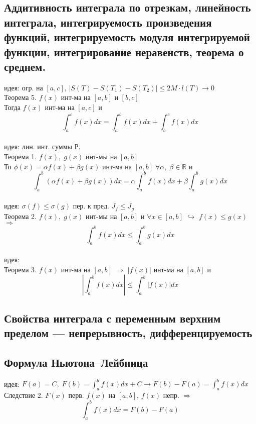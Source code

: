 \documentclass{article}
\begin{document}
\subsection{Аддитивность интеграла по отрезкам, линейность интеграла, интегрируемость произведения функций, интегрируемость модуля интегрируемой функции, интегрирование неравенств, теорема о среднем.}
идея: огр. на $[a,c]$,  $|S(T)-S(T_1)-S(T_2)| \leq 2M \cdot l(T) \rightarrow 0$ \\
Теорема 5. $f(x)$ инт-ма на $[a,b]$ и $[b,c]$ \\
Тогда $f(x)$ инт-ма на $[a,c]$ и
\begin{equation*}
    \int_a^c f(x) dx = \int_a^b f(x) dx + \int_b^c f(x) dx
\end{equation*}
\\
идея: лин. инт. суммы Р. \\
Теорема 1. $f(x), \; g(x)$ инт-мы на $[a,b]$ \\
То $\phi (x) = \alpha f(x) + \beta g(x) $ инт-ма на $[a,b] \; \forall \alpha, \; \beta \in \mathbb R$ и
\begin{equation*}
    \int_a^b (\alpha f(x) + \beta g(x)) dx = \alpha \int_a^b f(x) dx + \beta \int_a^b g(x) dx
\end{equation*}
\\
идея: $\sigma (f) \leq \sigma (g)$ пер. к пред. $J_f \leq J_g$ \\
Теорема 2. $f(x), \; g(x)$ инт-мы на $[a,b]$ и $\forall x \in [a,b]$ $\hookrightarrow$ $f(x) \leq g(x)$ $\Rightarrow$
\begin{equation*}
    \int_a^b f(x) dx \leq \int_a^b g(x) dx
\end{equation*}
\\
идея: \\
Теорема 3. $f(x)$ инт-ма на $[a,b]$ $\Rightarrow$ $|f(x)|$ инт-ма на $[a,b]$ и
\begin{equation*}
    |\int_a^b f(x) dx| \leq \int_a^b |f(x)| dx
\end{equation*}
\subsection{Свойства интеграла с переменным верхним пределом — непрерывность, дифференцируемость}
\subsection{Формула Ньютона–Лейбница}
идея: $F(a) = C, \; F(b) = \int_a^b f(x) dx + C \rightarrow F(b)-F(a) = \int_a^b f(x) dx $ \\
Следствие 2. $F(x)$ перв. $f(x)$ на $[a,b]$, $f(x)$ непр. $\Rightarrow$
\begin{equation*}
    \int_a^b f(x) dx = F(b) - F(a)
\end{equation*}
\end{document}
